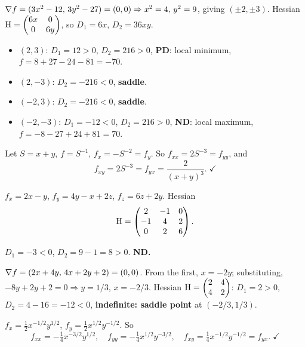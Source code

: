 \begin{solutions}
  \item $\nabla f = (3x^{2}-12,\,3y^{2}-27) = (0,0) \Rightarrow x^{2}=4,\,
        y^{2}=9$, giving $(\pm2,\pm3)$. Hessian
        $\operatorname{H} = \begin{pmatrix}6x&0\\0&6y\end{pmatrix}$, so $D_1=6x$,
        $D_2=36xy$.
        \begin{itemize}
          \item $(2,3)$: $D_1=12>0$, $D_2=216>0$, \textbf{PD}: local
                minimum, $f = 8+27-24-81 = -70$.
          \item $(2,-3)$: $D_2=-216<0$, \textbf{saddle}.
          \item $(-2,3)$: $D_2=-216<0$, \textbf{saddle}.
          \item $(-2,-3)$: $D_1=-12<0$, $D_2=216>0$, \textbf{ND}: local
                maximum, $f = -8-27+24+81 = 70$.
        \end{itemize}

  \item Let $S=x+y$, $f=S^{-1}$, $f_x = -S^{-2} = f_y$. So
        $f_{xx} = 2S^{-3} = f_{yy}$, and
        \[
          f_{xy} = 2S^{-3} = f_{yx} = \frac{2}{(x+y)^{3}} . \; \checkmark
        \]

  \item $f_x = 2x-y$, $f_y = 4y-x+2z$, $f_z = 6z+2y$. Hessian
        \[
          \operatorname{H} = \begin{pmatrix}2&-1&0\\-1&4&2\\0&2&6\end{pmatrix} .
        \]

  \item $D_1 = -3 < 0$, $D_2 = 9 - 1 = 8 > 0$. \textbf{ND.}

  \item $\nabla f = (2x+4y,\,4x+2y+2) = (0,0)$. From the first, $x=-2y$;
        substituting, $-8y+2y+2=0 \Rightarrow y=1/3$, $x=-2/3$. Hessian
        $\operatorname{H} = \begin{pmatrix}2&4\\4&2\end{pmatrix}$: $D_1=2>0$,
        $D_2=4-16=-12<0$, \textbf{indefinite: saddle point} at
        $(-2/3,1/3)$.

  \item $f_x = \tfrac12x^{-1/2}y^{1/2}$, $f_y = \tfrac12x^{1/2}y^{-1/2}$.
        So
        \[
          f_{xx} = -\tfrac14x^{-3/2}y^{1/2}, \quad
          f_{yy} = -\tfrac14x^{1/2}y^{-3/2}, \quad
          f_{xy} = \tfrac14x^{-1/2}y^{-1/2} = f_{yx} . \; \checkmark
        \]


\end{solutions}
